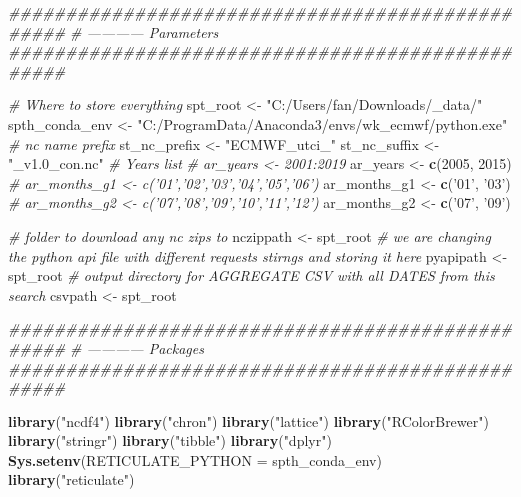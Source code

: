 \documentclass[
]{book}
\newenvironment{Shaded}{\begin{snugshade}}{\end{snugshade}}
\newcommand{\CommentTok}[1]{\textcolor[rgb]{0.56,0.35,0.01}{\textit{#1}}}
\newcommand{\DataTypeTok}[1]{\textcolor[rgb]{0.13,0.29,0.53}{#1}}
\newcommand{\DecValTok}[1]{\textcolor[rgb]{0.00,0.00,0.81}{#1}}
\newcommand{\KeywordTok}[1]{\textcolor[rgb]{0.13,0.29,0.53}{\textbf{#1}}}
\newcommand{\NormalTok}[1]{#1}
\newcommand{\StringTok}[1]{\textcolor[rgb]{0.31,0.60,0.02}{#1}}
\begin{document}
\begin{Shaded}
\begin{Highlighting}[]
\CommentTok{#################################################}
\CommentTok{# ------------ Parameters}
\CommentTok{#################################################}

\CommentTok{# Where to store everything}
\NormalTok{spt_root <-}\StringTok{ "C:/Users/fan/Downloads/_data/"}
\NormalTok{spth_conda_env <-}\StringTok{ "C:/ProgramData/Anaconda3/envs/wk_ecmwf/python.exe"}
\CommentTok{# nc name prefix}
\NormalTok{st_nc_prefix <-}\StringTok{ "ECMWF_utci_"}
\NormalTok{st_nc_suffix <-}\StringTok{ "_v1.0_con.nc"}
\CommentTok{# Years list}
\CommentTok{# ar_years <- 2001:2019}
\NormalTok{ar_years <-}\StringTok{ }\KeywordTok{c}\NormalTok{(}\DecValTok{2005}\NormalTok{, }\DecValTok{2015}\NormalTok{)}
\CommentTok{# ar_months_g1 <- c('01','02','03','04','05','06')}
\NormalTok{ar_months_g1 <-}\StringTok{ }\KeywordTok{c}\NormalTok{(}\StringTok{'01'}\NormalTok{, }\StringTok{'03'}\NormalTok{)}
\CommentTok{# ar_months_g2 <- c('07','08','09','10','11','12')}
\NormalTok{ar_months_g2 <-}\StringTok{ }\KeywordTok{c}\NormalTok{(}\StringTok{'07'}\NormalTok{, }\StringTok{'09'}\NormalTok{)}


\CommentTok{# folder to download any nc zips to}
\NormalTok{nczippath <-}\StringTok{ }\NormalTok{spt_root}
\CommentTok{# we are changing the python api file with different requests stirngs and storing it here}
\NormalTok{pyapipath <-}\StringTok{ }\NormalTok{spt_root}
\CommentTok{# output directory for AGGREGATE CSV with all DATES from this search}
\NormalTok{csvpath <-}\StringTok{ }\NormalTok{spt_root}

\CommentTok{#################################################}
\CommentTok{# ------------ Packages}
\CommentTok{#################################################}

\KeywordTok{library}\NormalTok{(}\StringTok{"ncdf4"}\NormalTok{)}
\KeywordTok{library}\NormalTok{(}\StringTok{"chron"}\NormalTok{)}
\KeywordTok{library}\NormalTok{(}\StringTok{"lattice"}\NormalTok{)}
\KeywordTok{library}\NormalTok{(}\StringTok{"RColorBrewer"}\NormalTok{)}
\KeywordTok{library}\NormalTok{(}\StringTok{"stringr"}\NormalTok{)}
\KeywordTok{library}\NormalTok{(}\StringTok{"tibble"}\NormalTok{)}
\KeywordTok{library}\NormalTok{(}\StringTok{"dplyr"}\NormalTok{)}
\KeywordTok{Sys.setenv}\NormalTok{(}\DataTypeTok{RETICULATE_PYTHON =}\NormalTok{ spth_conda_env)}
\KeywordTok{library}\NormalTok{(}\StringTok{"reticulate"}\NormalTok{)}


\end{Highlighting}
\end{Shaded}
\end{document}
